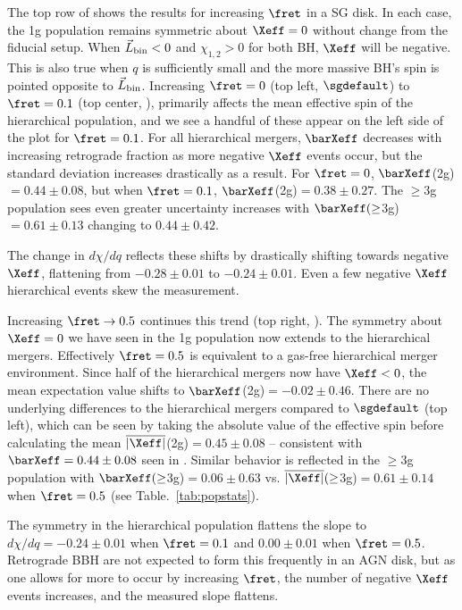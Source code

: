 The top row of  shows the results for increasing $\fret$ in a SG disk.
In each case, the 1g population remains symmetric about $\Xeff=0$ without change from the fiducial setup.
When $\vec{L}_{\rm bin}<0$ and $\chi_{1,2}>0$ for both BH, $\Xeff$ will be negative.
This is also true when $q$ is sufficiently small and the more massive BH's spin is pointed opposite to $\vec{L}_{\rm bin}$.
Increasing  $\fret=0$ (top left, $\sgdefault$) to $\fret=0.1$ (top center, ), primarily affects the mean effective spin of the hierarchical population, and we see a handful of these appear on the left side of the plot for $\fret=0.1$.
For all hierarchical mergers, $\barXeff$ decreases with increasing retrograde fraction as more negative $\Xeff$ events occur, but the standard deviation increases drastically as a result.
For $\fret=0$, $\barXeff$(2g)$=0.44\pm0.08$, but when $\fret=0.1$, $\barXeff$(2g)$=0.38\pm0.27$.
The $\geq$3g population sees even greater uncertainty increases with $\barXeff(\geq$3g)$=0.61\pm0.13$ changing to $0.44\pm0.42$.

The change in $d\chi/dq$ reflects these shifts by drastically shifting towards negative $\Xeff$, flattening from $-0.28\pm0.01$ to $-0.24\pm0.01$.
Even a few negative $\Xeff$ hierarchical events skew the measurement.

Increasing $\fret \rightarrow 0.5$ continues this trend (top right, ).
The symmetry about $\Xeff=0$ we have seen in the 1g population now extends to the hierarchical mergers.
Effectively $\fret=0.5$ is equivalent to a gas-free hierarchical merger environment.
Since half of the hierarchical mergers now have $\Xeff<0$, the mean expectation value shifts to $\barXeff$(2g)$=-0.02\pm0.46$.
There are no underlying differences to the hierarchical mergers compared to $\sgdefault$ (top left), which can be seen by taking the absolute value of the effective spin before calculating the mean $\overline{|\Xeff|}$(2g)$=0.45\pm0.08$ -- consistent with $\barXeff=0.44\pm0.08$ seen in \sgdefault.
Similar behavior is reflected in the $\geq$3g population with $\barXeff(\geq$3g)$=0.06\pm0.63$ vs.
$\overline{|\Xeff|}(\geq$3g)$=0.61\pm0.14$ when $\fret=0.5$ (see Table.~\ref{tab:popstats}).

The symmetry in the hierarchical population flattens the slope to $d\chi/dq=-0.24\pm0.01$ when $\fret=0.1$ and $0.00\pm0.01$ when $\fret=0.5$.
Retrograde BBH are not expected to form this frequently in an AGN disk, but as one allows for more to occur by increasing $\fret$, the number of negative $\Xeff$ events increases, and the measured slope flattens.

